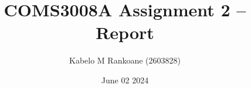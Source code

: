 

\title{COMS3008A Assignment 2 -- Report}
\author{Kabelo M Rankoane (2603828)}
\date{June 02 2024} 
\maketitle 
\pagestyle{fancy}
\fancyhf{}
\fancyhead[R]{\thepage}
{} 



 

